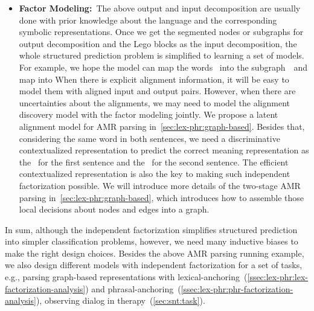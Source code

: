 {\begin{itemize}
\item \textbf{Factor Modeling:}~The above output and input
  decomposition are usually done with prior knowledge about the
  language and the corresponding symbolic representations. Once we get
  the segmented nodes or subgraphs for output decomposition and the
  Lego blocks as the input decomposition, the whole structured
  prediction problem is simplified to learning a set of models. For
  example, we hope the model can map the words~ into
  the subgraph~~and map 
  into  When there is explicit alignment
  information, it will be easy to model them with aligned input and
  output pairs. However, when there are uncertainties about the
  alignments, we may need to model the alignment discovery model with
  the factor modeling jointly. We propose a latent alignment model for
  AMR parsing in~\autoref{sec:lex-phr:graph-based}. Besides that,
  considering the same word  in both sentences, we need
  a discriminative contextualized representation to predict the
  correct meaning representation as the~ for the
  first sentence and the~ for the second
  sentence. The efficient contextualized representation is also the
  key to making such independent factorization possible. We will
  introduce more details of the two-stage AMR parsing
  in~\autoref{sec:lex-phr:graph-based}, which introduces how to
  assemble those local decisions about nodes and edges into a graph.
\end{itemize}

In sum, although the independent factorization simplifies structured
prediction into simpler classification problems, however, we need many
inductive biases to make the right design choices. Besides the above
AMR parsing running example, we also design different models with
independent factorization for a set of tasks, e.g., parsing
graph-based representations with
lexical-anchoring~(\autoref{ssec:lex-phr:lex-factorization-analysis})
and
phrasal-anchoring~(\autoref{ssec:lex-phr:phr-factorization-analysis}),
observing dialog in therapy~(\autoref{sec:snt:task}).

}
